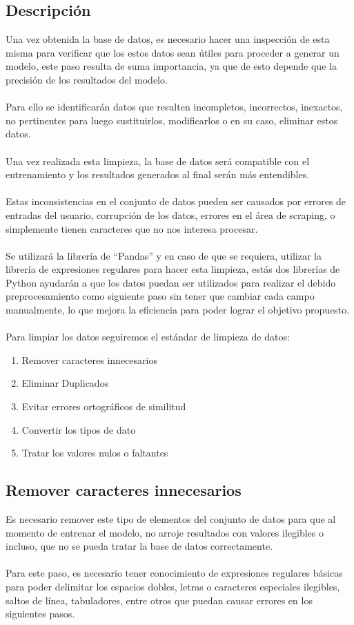 \documentclass[12pt, a4paper, titlepage]{report}
\begin{document}
		\subsection{Descripción}
		Una vez obtenida la base de datos, es necesario hacer una inspección de esta misma para verificar que los estos datos sean útiles para proceder a generar un modelo, este paso resulta de suma importancia, ya que de esto depende que la precisión de los resultados del modelo.\\\\
		Para ello se identificarán datos que resulten incompletos, incorrectos, inexactos, no pertinentes para
		luego sustituirlos, modificarlos o en su caso, eliminar estos datos.\\\\
		Una vez realizada esta limpieza, la base de datos será compatible con el entrenamiento y los resultados generados al final serán más entendibles.\\\\
		Estas inconsistencias en el conjunto de datos pueden ser causados por errores de entradas del usuario, corrupción de los datos, errores en el área de scraping, o simplemente tienen caracteres que no nos interesa procesar.\\\\
		
		Se utilizará la librería de “Pandas” y en caso de que se requiera, utilizar la librería de expresiones regulares para hacer esta limpieza, estás dos librerías de Python ayudarán a que los datos puedan ser utilizados para realizar el debido preprocesamiento como siguiente paso sin tener que cambiar cada campo manualmente, lo que mejora la eficiencia para poder lograr el objetivo propuesto.\\\\
		Para limpiar los datos seguiremos el estándar de limpieza de datos:\cite{data_cleaning}
		
		\begin{enumerate}
			\item Remover caracteres innecesarios
			\item Eliminar Duplicados
			\item Evitar errores ortográficos de similitud
			\item Convertir los tipos de dato
			\item Tratar los valores nulos o faltantes
		\end{enumerate}
		\newpage
		\subsection{Remover caracteres innecesarios} 
		Es necesario remover este tipo de elementos del conjunto de datos para que al momento de entrenar el modelo, no arroje resultados con valores ilegibles o incluso, que no se pueda tratar la base de datos correctamente.\\\\
		Para este paso, es necesario tener conocimiento de expresiones regulares básicas para poder delimitar los espacios dobles, letras o caracteres especiales ilegibles, saltos de línea, tabuladores, entre otros que puedan causar errores en los siguientes pasos.
		
\end{document}
